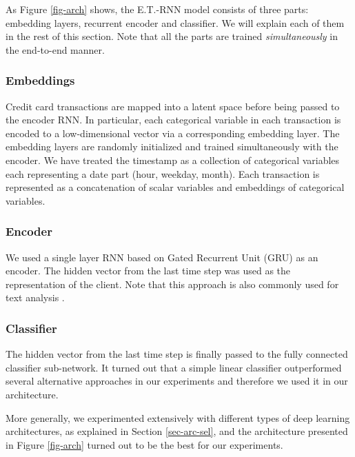 \documentclass[sigconf]{acmart}
\begin{document}
As Figure \ref{fig-arch} shows, the E.T.-RNN model consists of three parts: embedding layers, recurrent encoder and classifier. We will explain each of them in the rest of this section. Note that all the parts are trained \textit{simultaneously} in the end-to-end manner.

\subsubsection{Embeddings}

Credit card transactions are mapped into a latent space before being passed to the encoder RNN. In particular, each categorical variable in each transaction is encoded to a low-dimensional vector via a corresponding embedding layer. The embedding layers are randomly initialized and trained simultaneously with the encoder. We have treated the timestamp as a collection of categorical variables each representing a date part (hour, weekday, month). Each transaction is represented as a concatenation of scalar variables and embeddings of categorical variables.

\subsubsection{Encoder}

We used a single layer RNN based on Gated Recurrent Unit (GRU) \cite{DBLP:journals/corr/ChoMGBSB14} as an encoder.  The hidden vector from the last time step was used as the representation of the client. Note that this approach is also commonly used for text analysis \cite{NIPS2014_5346}.

\subsubsection{Classifier}

The hidden vector from the last time step is finally passed to the fully connected classifier sub-network.
It turned out that a simple linear classifier outperformed several alternative approaches in our experiments and therefore we used it in our architecture.

More generally, we experimented extensively with different types of deep learning architectures, as explained in Section \ref{sec-arc-sel}, and the architecture presented in Figure \ref{fig-arch} turned out to be the best for our experiments.
\end{document}
